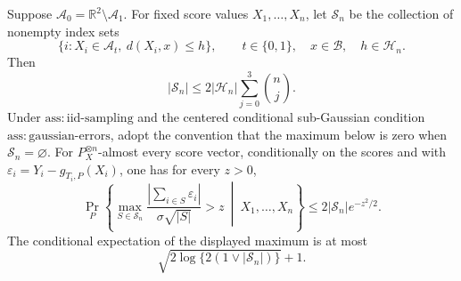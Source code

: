 Suppose \(\mathcal A_0=\mathbb R^2\setminus\mathcal A_1\). For fixed score values \(X_1,\ldots,X_n\), let \(\mathscr S_n\) be the collection of nonempty index sets
\[
 \{i:X_i\in\mathcal A_t,\ d(X_i,x)\le h\},
 \qquad t\in\{0,1\},\quad x\in\mathcal B,\quad h\in\mathcal H_n.
\]
Then
\[
 |\mathscr S_n|\le 2|\mathcal H_n|\sum_{j=0}^3\binom nj.
\]
Under \(\mathrm{ass:iid\text{-}sampling}\) and the centered conditional sub-Gaussian condition \(\mathrm{ass:gaussian\text{-}errors}\), adopt the convention that the maximum below is zero when \(\mathscr S_n=\varnothing\). For \(P_X^{\otimes n}\)-almost every score vector, conditionally on the scores and with \(\varepsilon_i=Y_i-g_{T_i,P}(X_i)\), one has for every \(z>0\),
\[
 \Pr_P\left\{\max_{S\in\mathscr S_n}
 \frac{|\sum_{i\in S}\varepsilon_i|}{\sigma\sqrt{|S|}}>z
 \ \middle|\ X_1,\ldots,X_n\right\}
 \le 2|\mathscr S_n|e^{-z^2/2}.
\]
The conditional expectation of the displayed maximum is at most
\[
 \sqrt{2\log\{2(1\vee|\mathscr S_n|)\}}+1.
\]